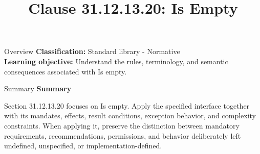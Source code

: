 \documentclass[10pt,letterpaper]{article}
\title{Clause 31.12.13.20: Is Empty}
\author{}
\date{}
\begin{document}
\maketitle
\begin{CornellOverviewBox}{Overview}
\textbf{Classification:} Standard library - Normative\\[2pt]
\textbf{Learning objective:} Understand the rules, terminology, and semantic consequences associated with Is empty.
\end{CornellOverviewBox}\begin{CornellSummaryBox}{Summary}
{\sffamily\bfseries\color{Accent} Summary}\par\vspace{3pt}Section 31.12.13.20 focuses on Is empty. Apply the specified interface together with its mandates, effects, result conditions, exception behavior, and complexity constraints. When applying it, preserve the distinction between mandatory requirements, recommendations, permissions, and behavior deliberately left undefined, unspecified, or implementation-defined.
\end{CornellSummaryBox}
\end{document}
